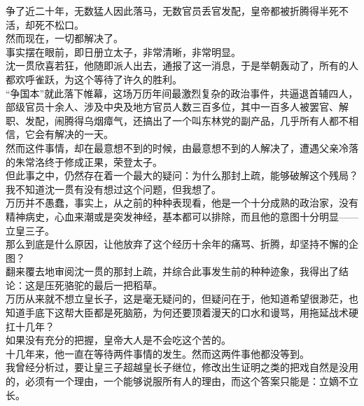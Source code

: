 \begin{multicols}{\theparacolNo}
争了近二十年，无数猛人因此落马，无数官员丢官发配，皇帝都被折腾得半死不活，却死不松口。\\

然而现在，一切都解决了。\\

事实摆在眼前，即日册立太子，非常清晰，非常明显。\\

沈一贯欣喜若狂，他随即派人出去，通报了这一消息，于是举朝轰动了，所有的人都欢呼雀跃，为这个等待了许久的胜利。\\

“争国本”就此落下帷幕，这场万历年间最激烈复杂的政治事件，共逼退首辅四人，部级官员十余人、涉及中央及地方官员人数三百多位，其中一百多人被罢官、解职、发配，闹腾得乌烟瘴气，还搞出了一个叫东林党的副产品，几乎所有人都不相信，它会有解决的一天。\\

然而这件事情，却在最意想不到的时候，由最意想不到的人解决了，遭遇父亲冷落的朱常洛终于修成正果，荣登太子。\\

但此事之中，仍然存在着一个最大的疑问：为什么那封上疏，能够破解这个残局？\\

我不知道沈一贯有没有想过这个问题，但我想了。\\

万历并不愚蠢，事实上，从之前的种种表现看，他是一个十分成熟的政治家，没有精神病史，心血来潮或是突发神经，基本都可以排除，而且他的意图十分明显——立皇三子。\\

那么到底是什么原因，让他放弃了这个经历十余年的痛骂、折腾，却坚持不懈的企图？\\

翻来覆去地审阅沈一贯的那封上疏，并综合此事发生前的种种迹象，我得出了结论：这是压死骆驼的最后一把稻草。\\

万历从来就不想立皇长子，这是毫无疑问的，但疑问在于，他知道希望很渺茫，也知道手底下这帮大臣都是死脑筋，为何还要顶着漫天的口水和谩骂，用拖延战术硬扛十几年？\\

如果没有充分的把握，皇帝大人是不会吃这个苦的。\\

十几年来，他一直在等待两件事情的发生。然而这两件事他都没等到。\\

我曾经分析过，要让皇三子超越皇长子继位，修改出生证明之类的把戏自然是没用的，必须有一个理由，一个能够说服所有人的理由，而这个答案只能是：立嫡不立长。\\


\end{multicols}

